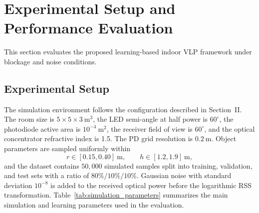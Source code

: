\documentclass[conference]{IEEEtran}
\begin{document}
\section{Experimental Setup and Performance Evaluation}

This section evaluates the proposed learning-based indoor VLP framework under blockage and noise conditions.

\subsection{Experimental Setup}

The simulation environment follows the configuration described in Section~II. The room size is $5\times 5\times 3~\mathrm{m}^3$, the LED semi-angle at half power is $60^\circ$, the photodiode active area is $10^{-4}~\mathrm{m}^2$, the receiver field of view is $60^\circ$, and the optical concentrator refractive index is 1.5. The PD grid resolution is $0.2~\mathrm{m}$. Object parameters are sampled uniformly within
\begin{equation}
r\in[0.15,0.40]~\mathrm{m},\qquad h\in[1.2,1.9]~\mathrm{m},
\end{equation}
and the dataset contains $50{,}000$ simulated samples split into training, validation, and test sets with a ratio of $80\%/10\%/10\%$. Gaussian noise with standard deviation $10^{-8}$ is added to the received optical power before the logarithmic RSS transformation. Table~\ref{tab:simulation_parameters} summarizes the main simulation and learning parameters used in the evaluation.




\end{document}
